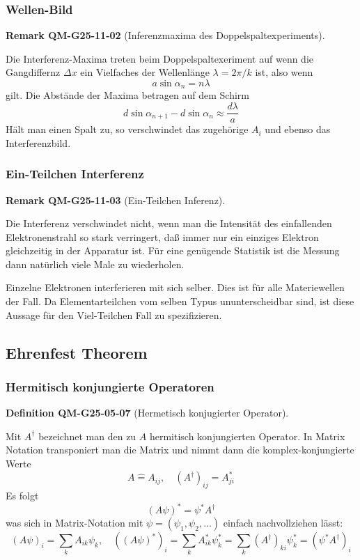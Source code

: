 \documentclass[10pt, letterpaper]{article}
\newcommand{\CustomHeading}[3]{%
  \par\medskip\noindent%
  \textbf{#1 #2} \textnormal{(#3)}.\enskip%
}
\newenvironment{DEF}[2]{\begin{unitbox}\CustomHeading{Definition}{#1}{#2}}{\end{unitbox}}
\newenvironment{REM}[2]{\begin{unitbox}\CustomHeading{Remark}{#1}{#2}}{\end{unitbox}}
\begin{document}
\subsubsection*{Wellen-Bild}


\begin{REM}{QM-G25-11-02}{Inferenzmaxima des Doppelspaltexperiments}
Die Interferenz-Maxima treten beim Doppelspaltexeriment auf wenn die Gangdiffernz $\Delta x$ ein Vielfaches der Wellenlänge $\lambda=2 \pi / k$ ist, also wenn
$$
a \sin \alpha_{n}=n \lambda
$$
gilt. Die Abstände der Maxima betragen auf dem Schirm
$$
d \sin \alpha_{n+1}-d \sin \alpha_{n} \approx \frac{d \lambda}{a}
$$
Hält man einen Spalt zu, so verschwindet das zugehörige $A_{i}$ und ebenso das Interferenzbild.
\end{REM}


\subsubsection*{Ein-Teilchen Interferenz}


\begin{REM}{QM-G25-11-03}{Ein-Teilchen Inferenz}
Die Interferenz verschwindet nicht, wenn man die Intensität des einfallenden Elektronenstrahl so stark verringert, daß immer nur ein einziges Elektron gleichzeitig in der Apparatur ist. Für eine genügende Statistik ist die Messung dann natürlich viele Male zu wiederholen.
\end{REM}

Einzelne Elektronen interferieren mit sich selber. Dies ist für alle Materiewellen der Fall. Da Elementarteilchen vom selben Typus ununterscheidbar sind, ist diese Aussage für den Viel-Teilchen Fall zu spezifizieren.





\subsection*{Ehrenfest Theorem}


\subsubsection*{Hermitisch konjungierte Operatoren}

\begin{DEF}{QM-G25-05-07}{Hermetisch konjugierter Operator}
Mit $A^{\dagger}$ bezeichnet man den zu $A$ hermitisch konjungierten Operator. In Matrix Notation transponiert man die Matrix und nimmt dann die komplex-konjungierte Werte
$$
A \hat{=} A_{i j}, \quad\left(A^{\dagger}\right)_{i j}=A_{j i}^{*}
$$
Es folgt
$$
(A \psi)^{*}=\psi^{*} A^{\dagger}
$$
was sich in Matrix-Notation mit $\psi=\left(\psi_{1}, \psi_{2}, \ldots\right)$ einfach nachvollziehen lässt:
$$
(A \psi)_{i}=\sum_{k} A_{i k} \psi_{k}, \quad\left((A \psi)^{*}\right)_{i}=\sum_{k} A_{i k}^{*} \psi_{k}^{*}=\sum_{k}\left(A^{\dagger}\right)_{k i} \psi_{k}^{*}=\left(\psi^{*} A^{\dagger}\right)_{i}
$$
\end{DEF}
\end{document}
